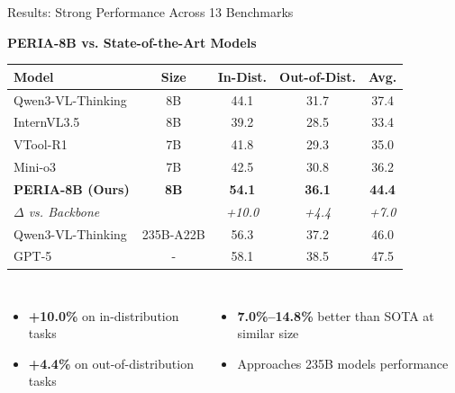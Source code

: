 \documentclass[aspectratio=169,xcolor=dvipsnames]{beamer}
\begin{document}
\begin{frame}{Results: Strong Performance Across 13 Benchmarks}
\begin{center}
\textbf{PERIA-8B vs. State-of-the-Art Models}
\end{center}

\vspace{-0.5em}

\begin{table}[h]
\centering
\small
\begin{tabular}{lcccc}
\toprule
\textbf{Model} & \textbf{Size} & \textbf{In-Dist.} & \textbf{Out-of-Dist.} & \textbf{Avg.} \\
\midrule
Qwen3-VL-Thinking & 8B & 44.1 & 31.7 & 37.4 \\
InternVL3.5 & 8B & 39.2 & 28.5 & 33.4 \\
VTool-R1 & 7B & 41.8 & 29.3 & 35.0 \\
Mini-o3 & 7B & 42.5 & 30.8 & 36.2 \\
\midrule
\textbf{PERIA-8B (Ours)} & \textbf{8B} & \textbf{54.1} & \textbf{36.1} & \textbf{44.4} \\
\textcolor{neuripsred}{\textit{$\Delta$ vs. Backbone}} & & \textcolor{neuripsred}{\textit{+10.0}} & \textcolor{neuripsred}{\textit{+4.4}} & \textcolor{neuripsred}{\textit{+7.0}} \\
\midrule
Qwen3-VL-Thinking & 235B-A22B & 56.3 & 37.2 & 46.0 \\
GPT-5 & - & 58.1 & 38.5 & 47.5 \\
\bottomrule
\end{tabular}
\end{table}

\vspace{0.5em}

\begin{columns}[c]
\begin{itemize}
    \item \textcolor{neuripsred}{\textbf{+10.0\%}} on in-distribution tasks
    \item \textcolor{neuripsred}{\textbf{+4.4\%}} on out-of-distribution tasks
\end{itemize}

\begin{itemize}
    \item \textbf{7.0\%--14.8\%} better than SOTA at similar size
    \item Approaches 235B models performance
\end{itemize}
\end{columns}
\end{frame}
\end{document}
